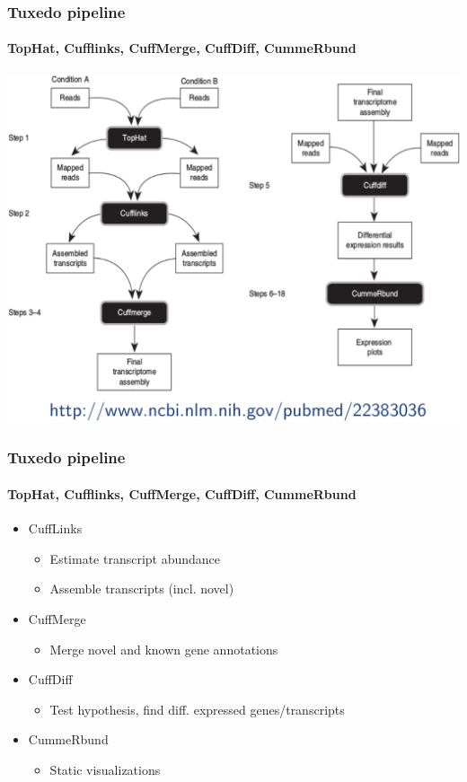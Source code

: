 \documentclass{beamer}			  %
\begin{document}
\begin{frame}
\frametitle{Tuxedo pipeline}
\framesubtitle{TopHat, Cufflinks, CuffMerge, CuffDiff, CummeRbund}
	\begin{center}
		\includegraphics[height=0.75\textheight]{figures/dge_07p.png}
	\end{center}
\end{frame}

\begin{frame}
\frametitle{Tuxedo pipeline}
\framesubtitle{TopHat, Cufflinks, CuffMerge, CuffDiff, CummeRbund}
	\begin{itemize}
		\item CuffLinks
		\begin{itemize}
			\item Estimate transcript abundance
			\item Assemble transcripts (incl. novel)
		\end{itemize}
		\item CuffMerge
		\begin{itemize}
			\item Merge novel and known gene annotations
		\end{itemize}
		\item CuffDiff
		\begin{itemize}
			\item Test hypothesis, find diff. expressed genes/transcripts
		\end{itemize}
		\item CummeRbund
		\begin{itemize}
			\item Static visualizations
		\end{itemize}
	\end{itemize}
\end{frame}
\end{document}
